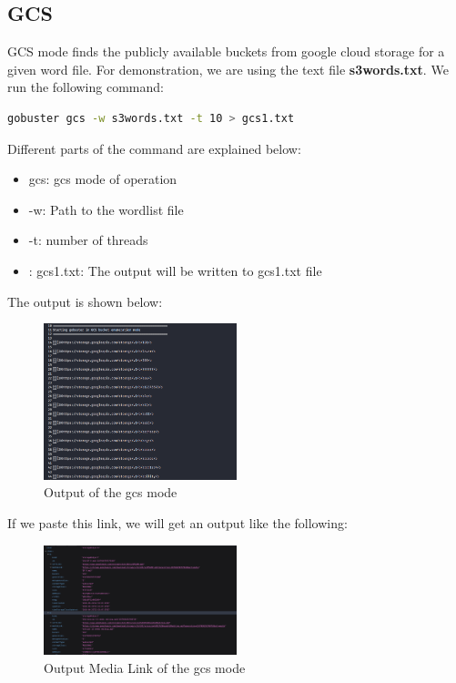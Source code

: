 \documentclass[12 pt]{article}
\begin{document}
\subsection{GCS}
GCS mode finds the publicly available buckets from google cloud storage for a given word file. For demonstration, we are using the text file \textbf{s3words.txt}. We run the following command:
\begin{lstlisting}[language=bash]
gobuster gcs -w s3words.txt -t 10 > gcs1.txt 
\end{lstlisting}
Different parts of the command are explained below:
\begin{itemize}
    \item gcs: gcs mode of operation
    \item -w: Path to the wordlist file
    \item -t: number of threads
    \item: gcs1.txt: The output will be written to gcs1.txt file
\end{itemize}
The output is shown below:
\begin{figure}[H]
    \centering
    \includegraphics[width=0.5\textwidth]{gcs_Output.png}
    \caption{Output of the gcs mode}
    \label{fig: gcs Output}
\end{figure}
\newline
If we paste this link, we will get an output like the following:
\begin{figure}[H]
    \centering
    \includegraphics[width=0.5\textwidth]{gcs_Output_MediaLink.png}
    \caption{Output Media Link of the gcs mode}
    \label{fig: gcs Output Media Link}
\end{figure}
\end{document}
